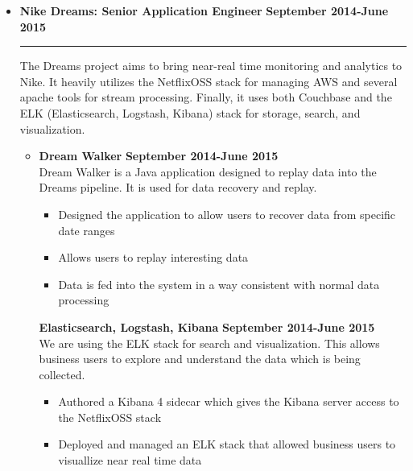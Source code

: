 \documentclass[overlapped]{res}
\begin{document}
\begin{resume}
\begin{itemize}[leftmargin=0in]
    \item[] 
        \textbf{Nike Dreams: Senior Application Engineer} \hfill \textbf{September 2014-June 2015} \\[-0.1in] \rule{\textwidth}{0.5pt}
        The Dreams project aims to bring near-real time monitoring and analytics to Nike. It heavily utilizes the NetflixOSS stack for managing
        AWS and several apache tools for stream processing. Finally, it uses both Couchbase and the ELK (Elasticsearch, Logstash, Kibana) 
        stack for storage, search, and visualization.
        \vspace{0.125in}
        \begin{itemize}[leftmargin=0in]
            \item[] 
                \begin{samepage}
                    \textbf{Dream Walker} \hfill \textbf{September 2014-June 2015} \\
                    Dream Walker is a Java application designed to replay data into the Dreams pipeline. It is used for
                    data recovery and replay.
                    \begin{itemize}
                        \item[\textbullet] Designed the application to allow users to recover data from specific date ranges
                        \item[\textbullet] Allows users to replay interesting data
                        \item[\textbullet] Data is fed into the system in a way consistent with normal data processing
                    \end{itemize}
                \end{samepage}
                \begin{samepage}
                    \textbf{Elasticsearch, Logstash, Kibana} \hfill \textbf{September 2014-June 2015} \\
                    We are using the ELK stack for search and visualization. This allows business users to explore and understand the data which is being collected.
                    \begin{itemize}
                        \item[\textbullet] Authored a Kibana 4 sidecar which gives the Kibana server access to the NetflixOSS stack
                        \item[\textbullet] Deployed and managed an ELK stack that allowed business users to visuallize near real time data

\end{itemize}
\end{samepage}
\end{itemize}
\end{itemize}
\end{resume}
\end{document}
